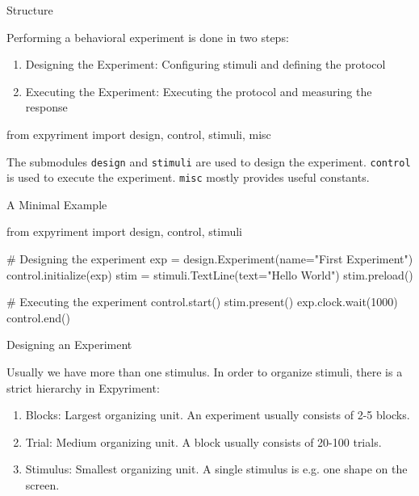 \begin{frame}[fragile]{Structure}

    Performing a behavioral experiment is done in two steps:

    \begin{enumerate}

        \item Designing the Experiment: Configuring stimuli and defining the protocol
        \item Executing the Experiment: Executing the protocol and measuring the response 

    \end{enumerate}

    \vspace{1em}

    \begin{pythoncode}
from expyriment import design, control, stimuli, misc
    \end{pythoncode}

    \vspace{1em}

    The submodules \texttt{design} and \texttt{stimuli} are used to design the experiment. \texttt{control} is used to execute the experiment. \texttt{misc} mostly provides useful constants.


\end{frame}


\begin{frame}[fragile]{A Minimal Example}
    \begin{pythoncode}
from expyriment import design, control, stimuli

# Designing the experiment
exp = design.Experiment(name="First Experiment")
control.initialize(exp)
stim = stimuli.TextLine(text="Hello World")
stim.preload()

# Executing the experiment
control.start()
stim.present()
exp.clock.wait(1000)
control.end()
    \end{pythoncode}

\end{frame}

\begin{frame}[fragile]{Designing an Experiment}

    Usually we have more than one stimulus. In order to organize stimuli, there is a strict hierarchy in Expyriment:

    \begin{enumerate}

        \item Blocks: Largest organizing unit. An experiment usually consists of 2-5 blocks.
        \item Trial: Medium organizing unit. A block usually consists of 20-100 trials.
        \item Stimulus: Smallest organizing unit. A single stimulus is e.g. one shape on the screen.

    \end{enumerate}

\end{frame}


